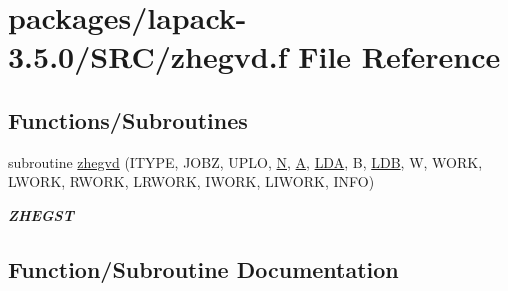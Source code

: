\hypertarget{zhegvd_8f}{}\section{packages/lapack-\/3.5.0/\+S\+R\+C/zhegvd.f File Reference}
\label{zhegvd_8f}
\subsection*{Functions/\+Subroutines}
\begin{DoxyCompactItemize}
\item 
subroutine \hyperlink{zhegvd_8f_a74fdf9b5a16c90d8b7a589dec5ca058a}{zhegvd} (I\+T\+Y\+P\+E, J\+O\+B\+Z, U\+P\+L\+O, \hyperlink{polmisc_8c_a0240ac851181b84ac374872dc5434ee4}{N}, \hyperlink{classA}{A}, \hyperlink{example__user_8c_ae946da542ce0db94dced19b2ecefd1aa}{L\+D\+A}, B, \hyperlink{example__user_8c_a50e90a7104df172b5a89a06c47fcca04}{L\+D\+B}, W, W\+O\+R\+K, L\+W\+O\+R\+K, R\+W\+O\+R\+K, L\+R\+W\+O\+R\+K, I\+W\+O\+R\+K, L\+I\+W\+O\+R\+K, I\+N\+F\+O)
\begin{DoxyCompactList}\small\item\em {\bfseries Z\+H\+E\+G\+S\+T} \end{DoxyCompactList}\end{DoxyCompactItemize}


\subsection{Function/\+Subroutine Documentation}
\hypertarget{zhegvd_8f_a74fdf9b5a16c90d8b7a589dec5ca058a}{}

